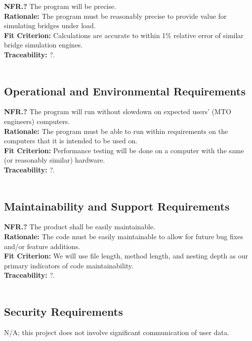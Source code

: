 \documentclass[12pt]{article}
\begin{document}
  \noindent\textbf{NFR.?} The program will be precise.\\
  \textbf{Rationale:} The program must be reasonably precise to provide value for simulating bridges under load.\\
  \textbf{Fit Criterion:} Calculations are accurate to within 1\% relative error of similar bridge simulation engines.\\
  \textbf{Traceability:} ?.\\\\

\subsection{Operational and Environmental Requirements}

  \textbf{NFR.?} The program will run without slowdown on expected users' (MTO engineers) computers.\\
  \textbf{Rationale:} The program must be able to run within requirements on the computers that it is intended to be used on.\\
  \textbf{Fit Criterion:} Performance testing will be done on a computer with the same (or reasonably similar) hardware.\\
  \textbf{Traceability:} ?.\\\\

\subsection{Maintainability and Support Requirements}

  \textbf{NFR.?} The product shall be easily maintainable.\\
  \textbf{Rationale:} The code must be easily maintainable to allow for future bug fixes and/or feature additions.\\
  \textbf{Fit Criterion:} We will use file length, method length, and nesting depth as our primary indicators of code maintainability.\\
  \textbf{Traceability:} ?.\\\\

\subsection{Security Requirements}

N/A; this project does not involve significant communication of user data.\\
\end{document}

